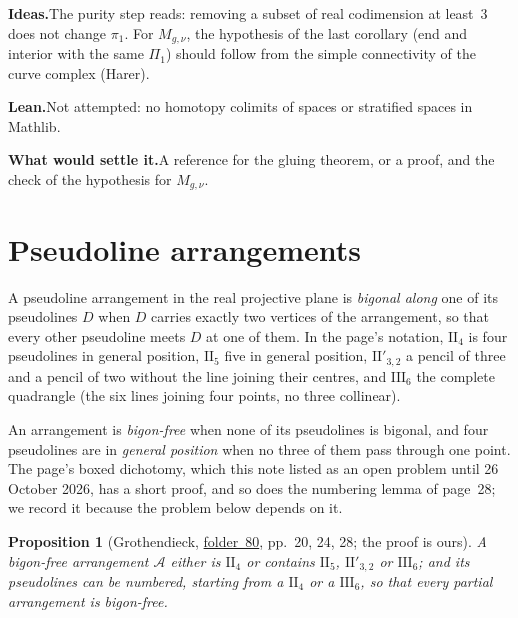 \documentclass[11pt]{article}
\newcommand{\fac}[1]{\href{https://grothendieck.umontpellier.fr/#1.pdf}{folder~#1}}
\theoremstyle{definition}
\theoremstyle{plain}\newtheorem*{proposition}{Proposition}\theoremstyle{definition}
\newcommand{\entry}[1]{\par\medskip\noindent\textbf{#1}\enspace}
\newcommand{\ideas}{\entry{Ideas.}}
\newcommand{\leanst}{\entry{Lean.}}
\newcommand{\settle}{\entry{What would settle it.}}
\begin{document}
\ideas The purity step reads: removing a subset of real codimension at least~$3$ does not change $\pi_1$. For $M_{g,\nu}$, the hypothesis of the last corollary (end and interior with the same $\Pi_1$) should follow from the simple connectivity of the curve complex (Harer).

\leanst Not attempted: no homotopy colimits of spaces or stratified spaces in Mathlib.

\settle A reference for the gluing theorem, or a proof, and the check of the hypothesis for $M_{g,\nu}$.

\section{Pseudoline arrangements}\label{sec:pseudo}

A pseudoline arrangement in the real projective plane is \emph{bigonal along} one of its pseudolines $D$ when $D$ carries exactly two vertices of the arrangement, so that every other pseudoline meets $D$ at one of them. In the page's notation, $\mathrm{II}_4$ is four pseudolines in general position, $\mathrm{II}_5$ five in general position, $\mathrm{II}'_{3,2}$ a pencil of three and a pencil of two without the line joining their centres, and $\mathrm{III}_6$ the complete quadrangle (the six lines joining four points, no three collinear).

An arrangement is \emph{bigon-free} when none of its pseudolines is bigonal, and four pseudolines are in \emph{general position} when no three of them pass through one point. The page's boxed dichotomy, which this note listed as an open problem until 26 October 2026, has a short proof, and so does the numbering lemma of page~28; we record it because the problem below depends on it.

\begin{proposition}[Grothendieck, \fac{80}, pp.~20, 24, 28; the proof is ours]
A bigon-free arrangement $\mathcal A$ either is $\mathrm{II}_4$ or contains $\mathrm{II}_5$, $\mathrm{II}'_{3,2}$ or $\mathrm{III}_6$; and its pseudolines can be numbered, starting from a $\mathrm{II}_4$ or a $\mathrm{III}_6$, so that every partial arrangement is bigon-free.
\end{proposition}
\end{document}

